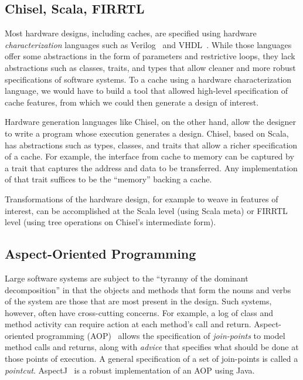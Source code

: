 \documentclass[conference]{IEEEtran}
\begin{document}
\subsection{Chisel, Scala, FIRRTL}

Most hardware designs, including caches, are specified using hardware \emph{characterization} languages such as Verilog~\cite{verilog} and VHDL~\cite{vhdl}.  While those languages offer some abstractions in the form of parameters and restrictive loops, they lack abstractions such as classes, traits, and types that allow cleaner and more robust specifications of software systems.  To a cache using a hardware characterization language, we would have to build a tool that allowed high-level specification of cache features, from which we could then generate a design of interest.

Hardware generation languages like Chisel, on the other hand, allow the designer to write a program whose execution generates a design.  Chisel, based on Scala, has abstractions such as types, classes, and traits that allow a richer specification of a cache.  For example, the interface from cache to memory can be captured by a trait that captures the address and data to be transferred.  Any implementation of that trait suffices to be the ``memory'' backing a cache.

Transformations of the hardware design, for example to weave in features of interest, can be accomplished at the Scala level (using Scala meta) or FIRRTL level (using tree operations on Chisel's intermediate form).

\subsection{Aspect-Oriented Programming}

Large software systems are subject to the ``tyranny of the dominant decomposition'' in that the objects and methods that form the nouns and verbs of the system are those that are most present in the design.  Such systems, however, often have cross-cutting concerns.  For example, a log of class and method activity can require action at each method's call and return.  Aspect-oriented programming (AOP)~\cite{Kicz97} allows the specification of \emph{join-points} to model method calls and returns, along with \emph{advice} that specifies what should be done at those points of execution.  A general specification of a set of join-points is called a \emph{pointcut}. AspectJ~\cite{AspectJ:01} is a robust implementation of an AOP using Java.
\end{document}
